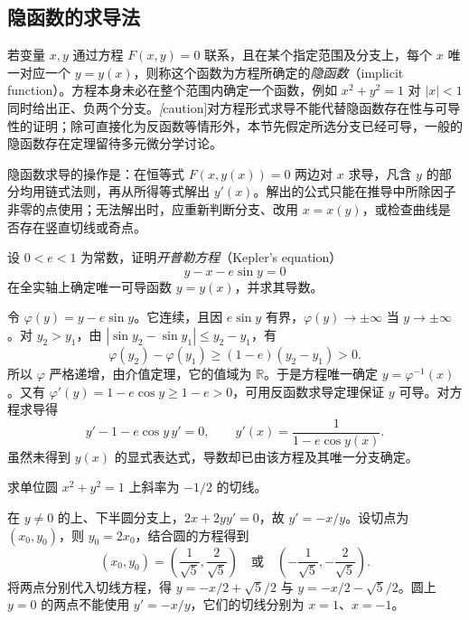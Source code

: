 \documentclass[UTF8,12pt,a4paper,fontset=fandol]{ctexbook}
\begin{document}
\subsection{隐函数的求导法}
\label{subsec:implicit-differentiation}

若变量 $x,y$ 通过方程 $F(x,y)=0$ 联系，且在某个指定范围及分支上，每个 $x$ 唯一对应一个 $y=y(x)$，则称这个函数为方程所确定的\emph{隐函数}（implicit function）。方程本身未必在整个范围内确定一个函数，例如 $x^2+y^2=1$ 对 $|x|<1$ 同时给出正、负两个分支。\emph[caution]{对方程形式求导不能代替隐函数存在性与可导性的证明}；除可直接化为反函数等情形外，本节先假定所选分支已经可导，一般的隐函数存在定理留待多元微分学讨论。

隐函数求导的操作是：在恒等式 $F(x,y(x))=0$ 两边对 $x$ 求导，凡含 $y$ 的部分均用链式法则，再从所得等式解出 $y'(x)$。解出的公式只能在推导中所除因子非零的点使用；无法解出时，应重新判断分支、改用 $x=x(y)$，或检查曲线是否存在竖直切线或奇点。

\begin{example}
\label{ex:kepler-equation-implicit-derivative}
设 $0<e<1$ 为常数，证明\emph{开普勒方程}（Kepler's equation）
\[
    y-x-e\sin y=0
\]
在全实轴上确定唯一可导函数 $y=y(x)$，并求其导数。
\end{example}
\begin{solve}
令 $\varphi(y)=y-e\sin y$。它连续，且因 $e\sin y$ 有界，$\varphi(y)\to\pm\infty$ 当 $y\to\pm\infty$。对 $y_2>y_1$，由 $|\sin y_2-\sin y_1|\leq y_2-y_1$，有
\[
    \varphi(y_2)-\varphi(y_1)
    \geq(1-e)(y_2-y_1)>0.
\]
所以 $\varphi$ 严格递增，由介值定理，它的值域为 $\mathbb R$。于是方程唯一确定 $y=\varphi^{-1}(x)$。又有 $\varphi'(y)=1-e\cos y\geq1-e>0$，可用反函数求导定理保证 $y$ 可导。对方程求导得
\[
    y'-1-e\cos y\,y'=0,
    \qquad y'(x)=\frac1{1-e\cos y(x)}.
\]
虽然未得到 $y(x)$ 的显式表达式，导数却已由该方程及其唯一分支确定。
\end{solve}

\begin{example}
\label{ex:circle-tangents-by-implicit-differentiation}
求单位圆 $x^2+y^2=1$ 上斜率为 $-1/2$ 的切线。
\end{example}
\begin{solve}
在 $y\ne0$ 的上、下半圆分支上，$2x+2yy'=0$，故 $y'=-x/y$。设切点为 $(x_0,y_0)$，则 $y_0=2x_0$，结合圆的方程得到
\[
    (x_0,y_0)=\left(\frac1{\sqrt5},\frac2{\sqrt5}\right)
    \quad\text{或}\quad
    \left(-\frac1{\sqrt5},-\frac2{\sqrt5}\right).
\]
将两点分别代入切线方程，得 $y=-x/2+\sqrt5/2$ 与 $y=-x/2-\sqrt5/2$。圆上 $y=0$ 的两点不能使用 $y'=-x/y$，它们的切线分别为 $x=1$、$x=-1$。
\end{solve}
\end{document}
